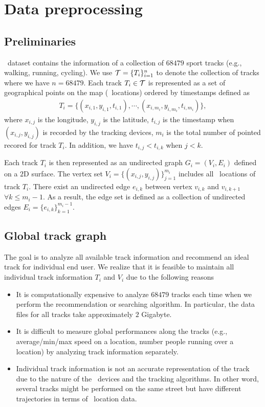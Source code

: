
\section{Data preprocessing}

\subsection{Preliminaries}

\edmd\ dataset contains the information of a collection of $68479$ sport tracks (e.g., walking, running, cycling).
We use $\mathcal{T}=\{T_i\}_{i=1}^n$ to denote the collection of tracks where we have $n=68479$.
Each track $T_i\in\mathcal{T}$ is represented as a set of geographical points on the map (\gps\ locations) ordered by timestamps defined as
\begin{align*}
	T_i = \{(x_{i,1},y_{i,1},t_{i,1}),\cdots,(x_{i,m_i},y_{i,m_i},t_{i,m_i})\},
\end{align*}
where $x_{i,j}$ is the longitude, $y_{i,j}$ is the latitude, $t_{i,j}$ is the timestamp when $(x_{i,j},y_{i,j})$ is recorded by the tracking devices, $m_i$ is the total number of pointed recored for track $T_i$.
In addition, we have $t_{i,j}<t_{i,k}$ when $j<k$.

Each track $T_i$ is then represented as an undirected graph $G_i = (V_i,E_i)$ defined on a $2$D surface.
The vertex set $V_i=\{(x_{i,j},y_{i,j})\}_{j=1}^{m_i}$ includes all \gps\ locations of track $T_i$.
There exist an undirected edge $e_{i,k}$ between vertex $v_{i,k}$ and $v_{i,k+1}$ $\forall k\le m_i-1$.
As a result, the edge set is defined as a collection of undirected edges $E_i = \{e_{i,k}\}_{k=1}^{m_i-1}$.

\subsection{Global track graph}\label{build_global_graph}

The goal is to analyze all available track information and recommend an ideal track for individual end user.
We realize that it is feasible to maintain all individual track information $T_i$ and $V_i$ due to the following reasons
\begin{itemize}
	\item It is computationally expensive to analyze $68479$ tracks each time when we perform the recommendation or searching algorithm. In particular, the data files for all tracks take approximately $2$ Gigabyte.
	\item It is difficult to measure global performances along the tracks (e.g., average/min/max speed on a location, number people running over a location) by analyzing track information separately. 
	\item Individual track information is not an accurate representation of the track due to the nature of the \gps\ devices and the tracking algorithms. In other word, several tracks might be performed on the same street but have different trajectories in terms of \gps\ location data. 
\end{itemize} 

